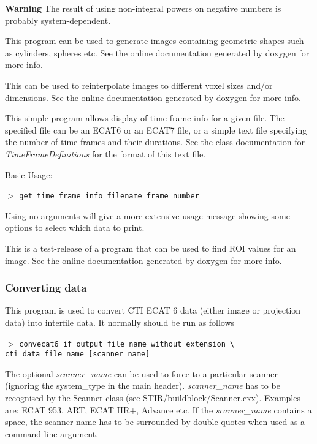 \documentclass{article}
\newcommand{\cmdline}[1]{\par \noindent $>$ \texttt{#1}\par}
\begin{document}
\textbf{Warning} The result of using non-integral powers on negative 
numbers is probably system-dependent.

{ 
}

This program can be used to generate 
images containing geometric shapes such as cylinders, spheres 
etc. See the online documentation generated by doxygen for more 
info.

{ 
}

This can be used to reinterpolate 
images to different voxel sizes and/or dimensions. See the online 
documentation generated by doxygen for more info.

{ 
}
\label{sec:get_time_frame_info}
This simple program allows display of time frame info for a given 
file. The specified file can be an ECAT6 or an ECAT7 file, or 
a simple text file specifying the number of time frames and their 
durations. See the class documentation for \textit{TimeFrameDefinitions} 
for the format of this text file.


\noindent
Basic Usage:
\cmdline{get\_time\_frame\_info filename frame\_number}


Using no arguments will give a more extensive usage message showing 
some options to select which data to print.

{ 
}

This is a test-release of a program that can be used to find 
ROI values for an image. See the online documentation generated 
by doxygen for more info.


\subsubsection{
Converting data}
\label{sec:convertingdata}
This program is used to convert CTI ECAT 6 data (either image 
or projection data) into interfile data. It normally should be 
run as follows
\cmdline{convecat6\_if output\_file\_name\_without\_extension {\textbackslash}\\
cti\_data\_file\_name [scanner\_name]}


The optional \textit{scanner\_name} can be used to force to a particular 
scanner (ignoring the system\_type in the main header). \textit{scanner\_name} 
has to be recognised by the Scanner class (see STIR/buildblock/Scanner.cxx). 
Examples are: ECAT 953, ART, ECAT HR+, Advance etc. If the \textit{scanner\_name} 
contains a space, the scanner name has to be surrounded by double 
quotes  when used as a command line argument.
\end{document}
